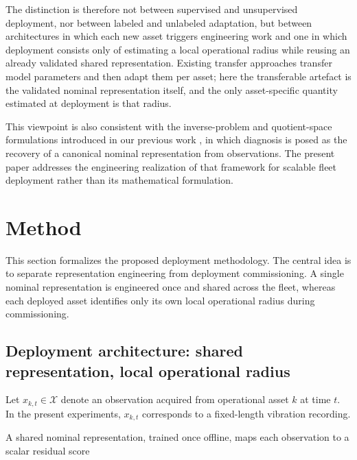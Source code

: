 \documentclass{trbunofficial}
\begin{document}
The distinction is therefore not between supervised and unsupervised
deployment, nor between labeled and unlabeled adaptation, but between
architectures in which each new asset triggers engineering work and one in
which deployment consists only of estimating a local operational radius while
reusing an already validated shared representation. Existing transfer
approaches transfer model parameters and then adapt them per asset; here the
transferable artefact is the validated nominal representation itself, and the
only asset-specific quantity estimated at deployment is that radius.

This viewpoint is also consistent with the inverse-problem and
quotient-space formulations introduced in our previous work
\citep{disanti2026inverse,disanti2026quotient}, in which diagnosis is posed
as the recovery of a canonical nominal representation from observations.
The present paper addresses the engineering realization of that framework
for scalable fleet deployment rather than its mathematical formulation.


\section{Method}
\label{sec:method}

This section formalizes the proposed deployment methodology. The central idea
is to separate representation engineering from deployment commissioning. A
single nominal representation is engineered once and shared across the fleet,
whereas each deployed asset identifies only its own local operational radius
during commissioning.

\subsection{Deployment architecture: shared representation, local operational radius}

Let $x_{k,t}\in\mathcal{X}$ denote an observation acquired from operational
asset $k$ at time $t$. In the present experiments,
$x_{k,t}$ corresponds to a fixed-length vibration recording.

A shared nominal representation, trained once offline, maps each observation
to a scalar residual score
\end{document}
